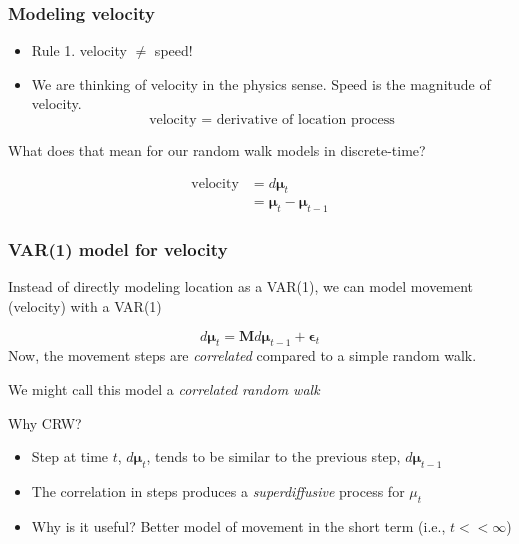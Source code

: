 \documentclass[36pt]{beamer}
\newcommand{\ft}[1]{\frametitle{#1}}
\newcommand{\bmu}{\boldsymbol{\mu}}
\newcommand{\be}{\boldsymbol{\epsilon}}
\begin{document}

\begin{frame}
\ft{Modeling velocity}

\begin{itemize}
\item Rule 1. velocity $\ne$ speed! 
\pause
\item We are thinking of velocity in the physics sense. Speed is the magnitude of velocity. 
$$\mbox{velocity = derivative of location process}$$
\end{itemize}
\bigskip

\pause

What does that mean for our random walk models in discrete-time? 

$$
\begin{aligned}
\mbox{velocity} &= d\bmu_t \\ 
&= \bmu_t-\bmu_{t-1} 
\end{aligned}
$$
\end{frame}


\begin{frame}
\ft{VAR(1) model for velocity}

Instead of directly modeling location as a VAR(1), we can model movement (velocity) with a VAR(1)

$$d\bmu_t = \mathbf{M}d\bmu_{t-1} + \be_t$$
Now, the movement steps are {\em correlated} compared to a simple random walk. 
\medskip

\pause

We might call this model  a {\em correlated random walk}
\medskip

\pause

\textcolor{noaaturq}{\Large Why CRW?}
\begin{itemize}
\item Step at time $t$, $d\bmu_t$, tends to be similar to the previous step, $d\bmu_{t-1}$
\item The correlation in steps produces a {\em superdiffusive} process for $\mu_t$
\item Why is it useful? Better model of movement in the short term (i.e., $t<<\infty$)
\end{itemize}
\end{frame}

\end{document}

